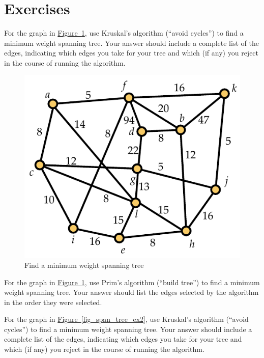 \documentclass[10pt,]{book}
\theoremstyle{plain}
\theoremstyle{definition}
\theoremstyle{definition}
\theoremstyle{definition}
\theoremstyle{definition}
\numberwithin{equation}{section}
\begin{document}
\section[{Exercises}]{Exercises}\label{s_graphalgorithms_exercises}
\begin{exerciselist}
\item[1.]\hypertarget{exercise-13}{}\hypertarget{p-255}{}%
For the graph in \hyperref[fig_span_tree_ex1]{Figure~\ref{fig_span_tree_ex1}}, use Kruskal's algorithm (``avoid cycles'') to find a minimum weight spanning tree. Your answer should include a complete list of the edges, indicating which edges you take for your tree and which (if any) you reject in the course of running the algorithm.%
\begin{figure}
\centering
\includegraphics[width=0.65\linewidth]{images/span_tree_ex1}
\caption{Find a minimum weight spanning tree\label{fig_span_tree_ex1}}
\end{figure}
\par\smallskip
\item[2.]\hypertarget{exercise-14}{}\hypertarget{p-256}{}%
For the graph in \hyperref[fig_span_tree_ex1]{Figure~\ref{fig_span_tree_ex1}}, use Prim's algorithm (``build tree'') to find a minimum weight spanning tree. Your answer should list the edges selected by the algorithm in the order they were selected.%
\par\smallskip
\item[3.]\hypertarget{exercise-15}{}\hypertarget{p-257}{}%
For the graph in \hyperref[fig_span_tree_ex2]{Figure~\ref{fig_span_tree_ex2}}, use Kruskal's algorithm (``avoid cycles'') to find a minimum weight spanning tree. Your answer should include a complete list of the edges, indicating which edges you take for your tree and which (if any) you reject in the course of running the algorithm.%
\begin{figure}

\end{figure}
\end{exerciselist}
\end{document}
